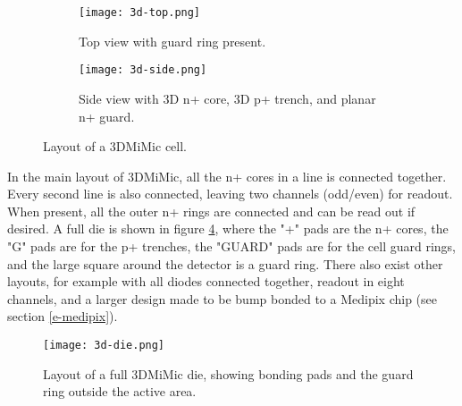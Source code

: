 \documentclass[../main/thesis.tex]{subfiles}
\begin{document}

\begin{figure}
	\centering
	\begin{subfigure}{.5\textwidth}
		\centering
		\texttt{[image: 3d-top.png]}
		\caption{Top view with guard ring present.}
		\label{fig-3dmimic-top}
	\end{subfigure}%
	\begin{subfigure}{.5\textwidth}
		\centering
		\texttt{[image: 3d-side.png]}
		\caption{Side view with 3D n+ core, 3D p+ trench, and planar n+ guard.}
		\label{fig-3dmimic-side} %
	\end{subfigure}
	\caption{Layout of a 3DMiMic cell. \citep{Marco}}
	\label{fig-3dmimic-top-side}
\end{figure}



In the main layout of 3DMiMic, all the n+ cores in a line is connected together. Every second line is also connected, leaving two channels (odd/even) for readout. When present, all the outer n+ rings are connected and can be read out if desired. A full die is shown in figure \ref{fig-3dmimic-die}, where the "+" pads are the n+ cores, the "G" pads are for the p+ trenches, the "GUARD" pads are for the cell guard rings, and the large square around the detector is a guard ring. There also exist other layouts, for example with all diodes connected together, readout in eight channels, and a larger design made to be bump bonded to a Medipix chip (see section \ref{e-medipix}). 

\begin{figure}%
	\centering
	\texttt{[image: 3d-die.png]}
	\caption{Layout of a full 3DMiMic die, showing bonding pads and the guard ring outside the active area. \citep{Marco}}
	\label{fig-3dmimic-die} %
\end{figure}
\end{document}
